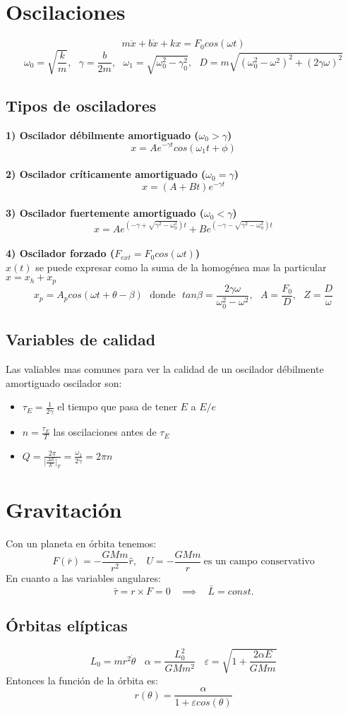 \documentclass[12pt]{article}
\begin{document}
\section{Oscilaciones}
	\[m\ddot{x} +b\dot{x}+kx=F_0cos(\omega t)\]
	\[\omega_0=\sqrt{\frac{k}{m}}, \ \ \ \gamma=\frac{b}{2m},\ \ \ \omega_1 = \sqrt{\omega_0^2-\gamma_0^2}, \ \ \ D=m\sqrt{(\omega_0^2-\omega^2)^2+(2\gamma \omega)^2}\] 
	\subsection{Tipos de osciladores}
	\textbf{1) Oscilador débilmente amortiguado ($\omega_0>\gamma$)}
	\[x=Ae^{-\gamma t}cos(\omega_1t+\phi)\]\\
	\textbf{2) Oscilador críticamente amortiguado ($\omega_0=\gamma$)}
	\[x=(A+Bt)e^{-\gamma t}\] \\
	\textbf{3) Oscilador fuertemente amortiguado ($\omega_0<\gamma$)}
	\[x=Ae^{(-\gamma+\sqrt{\gamma^2-\omega_0^2})t} + Be^{(-\gamma-\sqrt{\gamma^2-\omega_0^2})t}\] \\	
	\textbf{4) Oscilador forzado ($F_{ext}=F_0cos(\omega t)$)}\\
	$x(t)$ se puede expresar como la suma de la homogénea mas la particular $x=x_h+x_p$
	\[x_p=A_pcos(\omega t +\theta-\beta) \ \ \ \text{donde} \ \ \ tan\beta=\frac{2 \gamma \omega}{\omega_0^2-\omega^2}, \ \ \ A=\frac{F_0}{D}, \ \ \ Z=\frac{D}{\omega}\]
	
	\subsection{Variables de calidad}
	Las valiables mas comunes para ver la calidad de un oscilador débilmente amortiguado oscilador son:
	\begin{itemize}
		\item $\tau_E=\frac{1}{2\gamma}$ el tiempo que pasa de tener $E$ a $E/e$
		\item $n=\frac{\tau_E}{T}$ las oscilaciones antes de $\tau_E$
		\item $Q=\frac{2\pi}{|\frac{\Delta E}{E}|_T}=\frac{\omega_1}{2\gamma}=2\pi n$
	\end{itemize}
	
\section{Gravitación}
	Con un planeta en órbita tenemos:
	\[F(\bar{r})=-\frac{GMm}{r^2}\hat{r}, \ \ \ \ U=-\frac{GMm}{r} \ \text{es un campo conservativo} \]
	En cuanto a las variables angulares:
	\[\bar{\tau}=r\times F=0 \ \ \ \ \implies \ \ \ \ \bar{L}=const.\]
	
	\subsection{Órbitas elípticas}
	\[L_0=mr^2\dot{\theta} \ \ \ \ \alpha=\frac{L_0^2}{GMm^2}\ \ \ \ \varepsilon = \sqrt{1+\frac{2\alpha E}{GMm}}\]
	Entonces la función de la órbita es:
	\[r(\theta) = \frac{\alpha}{1 + \varepsilon cos(\theta)}\]
	
	
	
\end{document}
